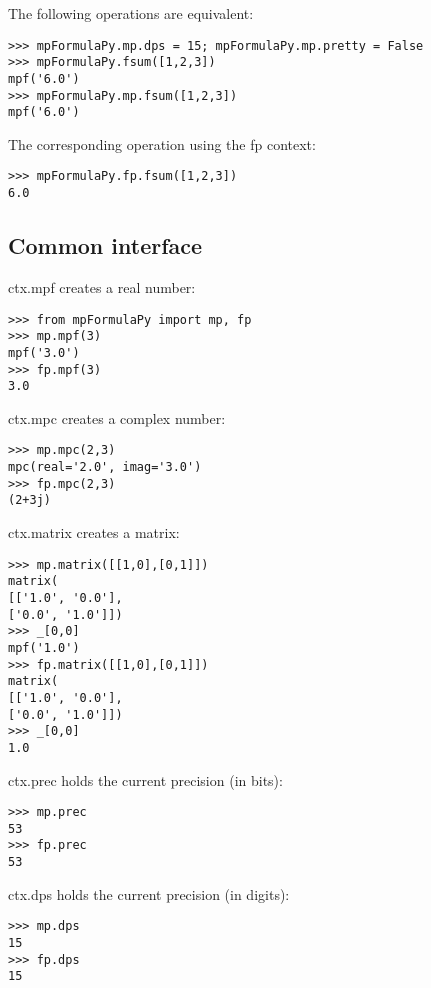 The following operations are equivalent:

\begin{lstlisting}
>>> mpFormulaPy.mp.dps = 15; mpFormulaPy.mp.pretty = False
>>> mpFormulaPy.fsum([1,2,3])
mpf('6.0')
>>> mpFormulaPy.mp.fsum([1,2,3])
mpf('6.0')
\end{lstlisting}


The corresponding operation using the fp context:

\begin{lstlisting}
>>> mpFormulaPy.fp.fsum([1,2,3])
6.0
\end{lstlisting}


\subsection{Common interface}  

ctx.mpf creates a real number:

\begin{lstlisting}
>>> from mpFormulaPy import mp, fp
>>> mp.mpf(3)
mpf('3.0')
>>> fp.mpf(3)
3.0
\end{lstlisting}


ctx.mpc creates a complex number:

\begin{lstlisting}
>>> mp.mpc(2,3)
mpc(real='2.0', imag='3.0')
>>> fp.mpc(2,3)
(2+3j)
\end{lstlisting}


ctx.matrix creates a matrix:

\begin{lstlisting}
>>> mp.matrix([[1,0],[0,1]])
matrix(
[['1.0', '0.0'],
['0.0', '1.0']])
>>> _[0,0]
mpf('1.0')
>>> fp.matrix([[1,0],[0,1]])
matrix(
[['1.0', '0.0'],
['0.0', '1.0']])
>>> _[0,0]
1.0
\end{lstlisting}


ctx.prec holds the current precision (in bits):

\begin{lstlisting}
>>> mp.prec
53
>>> fp.prec
53
\end{lstlisting}


ctx.dps holds the current precision (in digits):

\begin{lstlisting}
>>> mp.dps
15
>>> fp.dps
15
\end{lstlisting}


